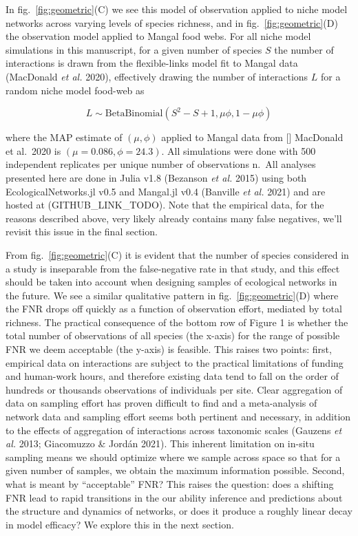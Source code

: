 \documentclass[11pt]{article}
\begin{document}
In fig.~\ref{fig:geometric}(C) we see this model of observation applied
to niche model networks across varying levels of species richness, and
in fig.~\ref{fig:geometric}(D) the observation model applied to Mangal
food webs. For all niche model simulations in this manuscript, for a
given number of species \(S\) the number of interactions is drawn from
the flexible-links model fit to Mangal data (MacDonald \emph{et al.}
2020), effectively drawing the number of interactions \(L\) for a random
niche model food-web as

\[L \sim  \text{BetaBinomial}(S^2-S+1,\mu\phi, 1-\mu\phi)\]

where the MAP estimate of \((\mu, \phi)\) applied to Mangal data from
{[}{]} MacDonald et al.~2020 is \((\mu=0.086, \phi=24.3)\). All
simulations were done with 500 independent replicates per unique number
of observations n.~All analyses presented here are done in Julia v1.8
(Bezanson \emph{et al.} 2015) using both EcologicalNetworks.jl v0.5 and
Mangal.jl v0.4 (Banville \emph{et al.} 2021) and are hosted at
(GITHUB\_LINK\_TODO). Note that the empirical data, for the reasons
described above, very likely already contains many false negatives,
we'll revisit this issue in the final section.

From fig.~\ref{fig:geometric}(C) it is evident that the number of
species considered in a study is inseparable from the false-negative
rate in that study, and this effect should be taken into account when
designing samples of ecological networks in the future. We see a similar
qualitative pattern in fig.~\ref{fig:geometric}(D) where the FNR drops
off quickly as a function of observation effort, mediated by total
richness. The practical consequence of the bottom row of Figure 1 is
whether the total number of observations of all species (the x-axis) for
the range of possible FNR we deem acceptable (the y-axis) is feasible.
This raises two points: first, empirical data on interactions are
subject to the practical limitations of funding and human-work hours,
and therefore existing data tend to fall on the order of hundreds or
thousands observations of individuals per site. Clear aggregation of
data on sampling effort has proven difficult to find and a meta-analysis
of network data and sampling effort seems both pertinent and necessary,
in addition to the effects of aggregation of interactions across
taxonomic scales (Gauzens \emph{et al.} 2013; Giacomuzzo \& Jordán
2021). This inherent limitation on in-situ sampling means we should
optimize where we sample across space so that for a given number of
samples, we obtain the maximum information possible. Second, what is
meant by ``acceptable'' FNR? This raises the question: does a shifting
FNR lead to rapid transitions in the our ability inference and
predictions about the structure and dynamics of networks, or does it
produce a roughly linear decay in model efficacy? We explore this in the
next section.
\end{document}
